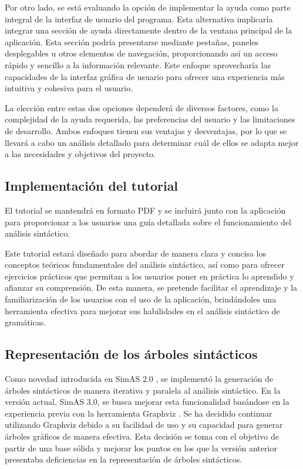 Por otro lado, se está evaluando la opción de implementar la ayuda como parte integral de la interfaz de usuario del programa. Esta alternativa implicaría integrar una sección de ayuda directamente dentro de la ventana principal de la aplicación. Esta sección podría presentarse mediante pestañas, paneles desplegables u otros elementos de navegación, proporcionando así un acceso rápido y sencillo a la información relevante. Este enfoque aprovecharía las capacidades de la interfaz gráfica de usuario para ofrecer una experiencia más intuitiva y cohesiva para el usuario.

La elección entre estas dos opciones dependerá de diversos factores, como la complejidad de la ayuda requerida, las preferencias del usuario y las limitaciones de desarrollo. Ambos enfoques tienen sus ventajas y desventajas, por lo que se llevará a cabo un análisis detallado para determinar cuál de ellos se adapta mejor a las necesidades y objetivos del proyecto.

\subsection{Implementación del tutorial}

El tutorial se mantendrá en formato PDF y se incluirá junto con la aplicación para proporcionar a los usuarios una guía detallada sobre el funcionamiento del análisis sintáctico. 

Este tutorial estará diseñado para abordar de manera clara y concisa los conceptos teóricos fundamentales del análisis sintáctico, así como para ofrecer ejercicios prácticos que permitan a los usuarios poner en práctica lo aprendido y afianzar su comprensión. De esta manera, se pretende facilitar el aprendizaje y la familiarización de los usuarios con el uso de la aplicación, brindándoles una herramienta efectiva para mejorar sus habilidades en el análisis sintáctico de gramáticas.

\subsection{Representación de los árboles sintácticos}

Como novedad introducida en SimAS 2.0 \cite{juan}, se implementó la generación de árboles sintácticos de manera iterativa y paralela al análisis sintáctico. En la versión actual, SimAS 3.0, se busca mejorar esta funcionalidad basándose en la experiencia previa con la herramienta Graphviz \cite{graphviz}. Se ha decidido continuar utilizando Graphviz debido a su facilidad de uso y su capacidad para generar árboles gráficos de manera efectiva. Esta decisión se toma con el objetivo de partir de una base sólida y mejorar los puntos en los que la versión anterior presentaba deficiencias en la representación de árboles sintácticos.


